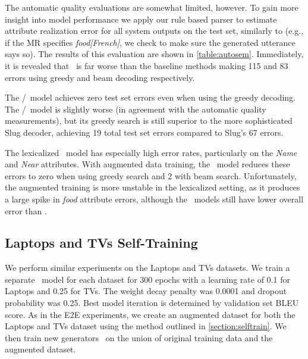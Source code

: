 The automatic quality evaluations are somewhat limited, however. To gain
more insight into model performance
we apply our rule based parser to estimate attribute realization error
for all system outputs on the test set,
similarly to \cite{duvsek2019evaluating}
(e.g., if the MR specifies \textit{food[French]},
we check to make sure the generated utterance says so). 
The results of this evaluation are shown in \autoref{table:autosem}.
Immediately, it is revealed that \basegen~is far worse than the baseline 
methods making 115 and 83 errors using greedy and beam decoding respectively.


The \auggen/~model achieves zero test set
errors even when using the greedy 
decoding. The \auggen/\learnedclf~model is slightly worse (in agreement 
with the automatic quality measurements), but its greedy search is still
superior to the more sophisticated Slug decoder, achieving 19 total
test set errors compared to Slug's 67 errors.


%




The lexicalized \basegen~model has especially high error rates, 
particularly on the \textit{Name} and \textit{Near} attributes.
With augmented data training, the \auggen~model reduces these errors
 to zero when using greedy search and 2 with beam search. Unfortunately,
the augmented training is more unstable in the lexicalized setting, 
as it produces a large spike in \textit{food} attribute errors, although
the \auggen~models still have lower overall error than  \basegen.
 

\subsection{Laptops and TVs Self-Training}
We perform similar experiments on the Laptops and TVs datasets. 
We train a separate \basegen~model for each dataset 
for 300 epochs with a learning rate of 0.1
for Laptops and 0.25 for TVs. The weight decay penalty was 0.0001 
and dropout probability was 0.25. Best model iteration is determined
by validation set BLEU score. As in the E2E experiments, we create an augmented
dataset for both the Laptops and TVs dataset using the method
outlined in \autoref{section:selftrain}. We then train new generators 
\auggen~on the union of original training data and the augmented dataset.

